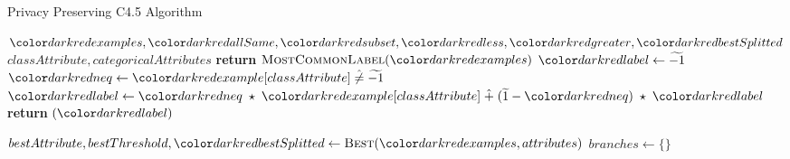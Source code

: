 \begin{algorithm}[H]
\caption{Privacy Preserving C4.5 Algorithm}\label{a:c45-pp}
\begin{algorithmic}[1]
  \renewcommand{\algorithmicrequire}{\textbf{Private Vars:}}
  \Require $\red{examples}, {\red{allSame}}, \red{subset}, \red{less}, \red{greater}, \red{bestSplitted}$
  \renewcommand{\algorithmicrequire}{\textbf{Global Vars:}}
  \Require $classAttribute, categoricalAttributes$
          \State \textbf{return} $\textsc{MostCommonLabel}(\red{examples})$
      \State $\red{label} \gets \enc{-1}$
          \State $\red{neq} \gets \red{example}[classAttribute] \hneq \enc{-1}$
          \State $\red{label} \gets \red{neq} \hmul \red{example}[classAttribute] \hplus (\enc{1} - \red{neq}) \hmul \red{label} $
      \EndFor
      \State \textbf{return} {{}}$(\red{label})$
    \EndIf


    \State $bestAttribute, bestThreshold, \red{bestSplitted} \gets \textsc{Best}(\red{examples}, attributes)$
    \State $branches \gets \{\}$

    \end{algorithmic}
    \end{algorithm}
